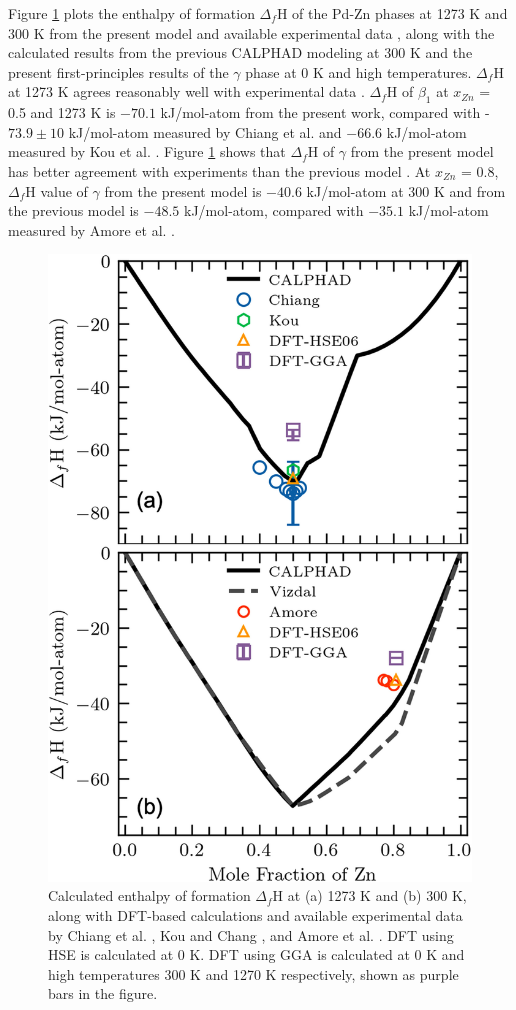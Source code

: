 Figure \ref{intermetallics:fig:PdZnHMR} plots the enthalpy of formation $\Delta_f$H of the Pd-Zn phases at 1273 K and 300 K from the present model and available experimental data \cite{amore2009thermochemistry, ChiangIpserChang1977, kou1975thermodynamics}, along with the calculated results from the previous CALPHAD modeling \cite{vizdal2006experimental} at 300 K and the present first-principles results of the $\gamma$ phase at 0 K and high temperatures. $\Delta_f$H at 1273 K agrees reasonably well with experimental data \cite{ChiangIpserChang1977, kou1975thermodynamics}. $\Delta_f$H of $\beta_1$ at $x_{Zn}$ = 0.5 and 1273 K is $-70.1$ kJ/mol-atom from the present work, compared with -$73.9\pm10$ kJ/mol-atom measured by Chiang et al. \cite{ChiangIpserChang1977} and $-66.6$ kJ/mol-atom measured by Kou et al. \cite{kou1975thermodynamics}. Figure \ref{intermetallics:fig:PdZnHMR} shows that $\Delta_f$H of $\gamma$ from the present model has better agreement with experiments than the previous model \cite{vizdal2006experimental}. At $x_{Zn}$ = 0.8, $\Delta_f$H value of $\gamma$ from the present model is $-40.6$ kJ/mol-atom at 300 K and from the previous model \cite{vizdal2006experimental} is $-48.5$ kJ/mol-atom, compared with $-35.1$ kJ/mol-atom measured by Amore et al. \cite{amore2009thermochemistry}.

\begin{figure}[H]
    \centering
    \includegraphics[width=0.5\linewidth]{intermetallics/Intermetallics-PdZnHMR.jpg}
    \caption{Calculated enthalpy of formation $\Delta_f$H at (a) 1273 K and (b) 300 K, along with DFT-based calculations and available experimental data by Chiang et al. \cite{ChiangIpserChang1977}, Kou and Chang \cite{kou1975thermodynamics}, and Amore et al. \cite{amore2009thermochemistry}. DFT using HSE is calculated at 0 K. DFT using GGA is calculated at 0 K and high temperatures 300 K and 1270 K respectively, shown as purple bars in the figure.}
    \label{intermetallics:fig:PdZnHMR}
\end{figure}

